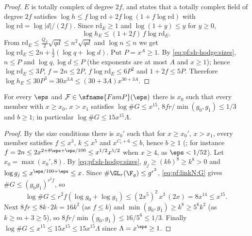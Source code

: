 \begin{proof}
$E$ is totally complex of degree $2f$, and  states that a totally complex field of
degree $2f$ satisfies $\log h\le f\log\mathrm{rd}+2f\log(1+f\log\mathrm{rd})$ with $\log\mathrm{rd}=\log|d|/(2f)$. Since $\mathrm{rd}_E\ge1$ and
$\log(1+y)\le y$ for $y\ge0$,
\[
\log h_E\le(1+2f)\,f\log\mathrm{rd}_E .
\]
From $\mathrm{rd}_E\le\frac{Q_S}2\sqrt{qd}\le n^2\sqrt{qd}$ and $\log n\le n$ we get $\log\mathrm{rd}_E\le2n+\frac12(\log q+\log d)$. Put $P=x^A\ge1$.
By \eqref{eq:pf:sh-hodge:sizes}, $n\le P$ and $\log q,\log d\le P$ (the exponents are at most $A$ and $x\ge1$); hence $\log\mathrm{rd}_E\le3P$, $f=2n\le2P$,
$f\log\mathrm{rd}_E\le6P^2$ and $1+2f\le5P$. Therefore $\log h_E\le30P^3=30x^{3A}\le(30+3A)x^{30+3A}$.
\end{proof}

\begin{lemma}\label{pf:sh-hodge:G}
For every $\eps$ and $\mathcal F\in\sfname{FamP}(\eps)$ there is $x_0$ such that every member with $x\ge x_0$, $x>x_1$ satisfies $\log\#G\le x^{15}$,
$8fr/\min(g_0,g_1)\le1/3$ and $b\ge1$; in particular $\log\#G\le15x^{15}\Lambda$.
\end{lemma}

\begin{proof}
By the size conditions there is $x_0'$ such that for $x\ge x_0'$, $x>x_1$, every member satisfies $f\le x^3$, $k\le x^5$ and $x^{C_t+6}\le b$, hence $b\ge1$
(; for instance $f=2n\le2x^{2+8\eps+\eps/100}\le x^{1/2}x^{5/2}$ when $x\ge4$, as $\eps<1/52$).
Let $x_0=\max(x_0',8)$. By \eqref{eq:pf:sh-hodge:sizes}, $g_j\ge(kb)^8\ge k^8>0$ and $\log g_j\le x^{\eps/100+\eps}\le x$. Since
$\#\GL_r(\F_{g})\le g^{r^2}$, \eqref{eq:pf:linkN:G} gives $\#G\le(g_0g_1)^{r^2f}$, so
\[
\log\#G\le r^2f(\log g_0+\log g_1)\le(2x^5)^2\,x^3\,(2x)=8x^{14}\le x^{15}.
\]
Next $8fr\le8k\cdot2k=16k^2$ (as $f\le k$) and $\min(g_0,g_1)\ge k^8\ge5^6k^2$ (as $k\ge m+3\ge5$), so $8fr/\min(g_0,g_1)\le16/5^6\le1/3$. Finally
$\log\#G\le x^{15}\le15x^{15}\le15x^{15}\Lambda$ since $\Lambda=x^\eps\ge1$.
\end{proof}


